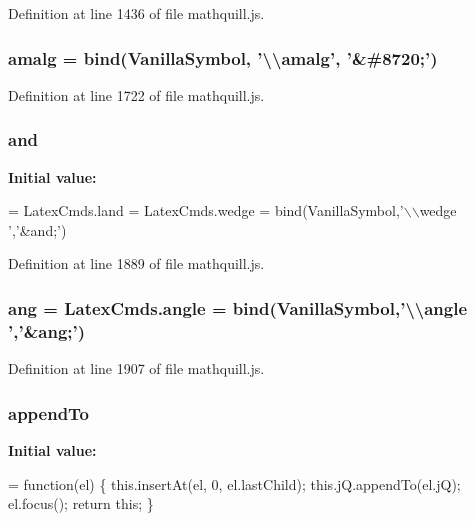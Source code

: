 Definition at line 1436 of file mathquill.\-js.

\subsubsection[{amalg}]{ amalg = {\bf bind}({\bf Vanilla\-Symbol}, '\textbackslash{}\textbackslash{}amalg', '\&\#8720;')}\label{mathquill_8js_a253cc67d9aaf658992d6a9aa66f67bcb}


Definition at line 1722 of file mathquill.\-js.

\subsubsection[{and}]{ and}\label{mathquill_8js_ac39c488ee3bd6d675c340966d33495a7}
{\bfseries Initial value\-:}
\begin{DoxyCode}
= LatexCmds.land = LatexCmds.wedge =
  bind(VanillaSymbol,\textcolor{stringliteral}{'\(\backslash\)\(\backslash\)wedge '},\textcolor{stringliteral}{'&and;'})
\end{DoxyCode}


Definition at line 1889 of file mathquill.\-js.

\subsubsection[{ang}]{ ang = Latex\-Cmds.\-angle = {\bf bind}({\bf Vanilla\-Symbol},'\textbackslash{}\textbackslash{}angle ','\&ang;')}\label{mathquill_8js_af32285954ac6d9e138c524645395326d}


Definition at line 1907 of file mathquill.\-js.

\subsubsection[{append\-To}]{\setlength{\rightskip}{0pt plus 5cm}{\bf \-\_\-} append\-To}\label{mathquill_8js_a1aee4aabf4db02061074f22383a5fd68}
{\bfseries Initial value\-:}
\begin{DoxyCode}
= \textcolor{keyword}{function}(el) \{
  this.insertAt(el, 0, el.lastChild);
  this.jQ.appendTo(el.jQ);
  el.focus();
  \textcolor{keywordflow}{return} \textcolor{keyword}{this};
\}
\end{DoxyCode}


